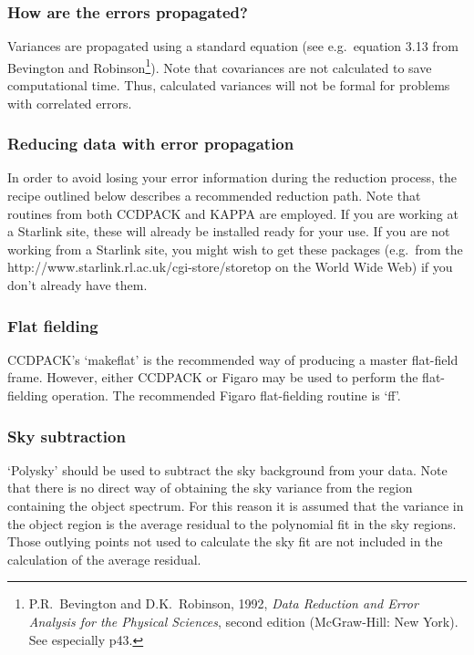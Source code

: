 \subsubsection{How are the errors propagated?}

Variances are propagated using a standard equation (see e.g.\ equation 3.13
from Bevington and Robinson\footnote{P.R.~Bevington and D.K.~Robinson,
1992, {\it Data Reduction and Error Analysis for the Physical Sciences},
second edition (McGraw-Hill: New York).  See especially p43.}).
Note that covariances are not calculated to save computational time.  Thus,
calculated variances will not be formal for problems with correlated errors.

\subsubsection{Reducing data with error propagation}

In order to avoid losing your error information during the reduction
process, the recipe outlined below describes a recommended reduction
path. Note that routines from both CCDPACK and KAPPA are employed. If you
are working at a Starlink site, these will already be installed ready for
your use.  If you are not working from a Starlink site, you might wish to
get these packages (e.g.\ from the
{http://www.starlink.rl.ac.uk/cgi-store/storetop}
on the World Wide Web) if you don't already have them.

\subsubsection{Flat fielding}

CCDPACK's `makeflat' is the recommended way of producing a master 
flat-field frame. 
However, either CCDPACK or Figaro may be used to perform the
flat-fielding operation. 
The recommended Figaro flat-fielding routine is `ff'.

\subsubsection{Sky subtraction}

`Polysky' should be used to subtract the sky background from your data. Note
that there is no direct way of obtaining the sky variance from the region
containing the object spectrum. For this reason it is assumed that the
variance in the object region is the average residual to the polynomial
fit in the sky regions. Those outlying points not used to calculate the
sky fit are not included in the calculation of the average residual.

